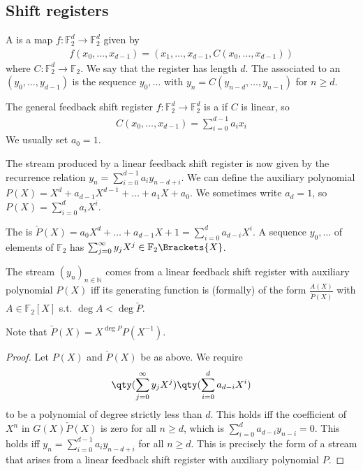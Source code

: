 \subsection{Shift registers}
\begin{definition}
    A  is a map $f \colon \mathbb F_2^d \to \mathbb F_2^d$ given by
    \begin{align*}
        f(x_0, \dots, x_{d-1}) = (x_1, \dots, x_{d-1}, C(x_0, \dots, x_{d-1}))
    \end{align*}
    where $C \colon \mathbb F_2^d \to \mathbb F_2$.
    We say that the register has length $d$.
    The  associated to an  $(y_0, \dots, y_{d-1})$ is the sequence $y_0, \dots$ with $y_n = C(y_{n-d}, \dots, y_{n-1})$ for $n \geq d$.
\end{definition}
\begin{definition}
    The general feedback shift register $f \colon \mathbb F_2^d \to \mathbb F_2^d$ is a  if $C$ is linear, so
    \begin{align*}
        C(x_0, \dots, x_{d-1}) = \sum_{i=0}^{d-1} a_i x_i
    \end{align*}
    We usually set $a_0 = 1$.
\end{definition}
The stream produced by a linear feedback shift register is now given by the recurrence relation $y_n = \sum_{i=0}^{d-1} a_i y_{n-d+i}$.
We can define the auxiliary polynomial $P(X) = X^d + a_{d-1} X^{d-1} + \dots + a_1 X + a_0$.
We sometimes write $a_d = 1$, so $P(X) = \sum_{i=0}^d a_i X^i$.
\begin{definition}
    The  is $\check{P}(X) = a_0 X^d + \dots + a_{d-1} X + 1 = \sum_{i=0}^d a_{d-i} X^i$.
    A sequence $y_0, \dots$ of elements of $\mathbb F_2$ has  $\sum_{j=0}^\infty y_j X^j \in \mathbb F_2\Brackets{X}$.
\end{definition}
\begin{theorem}
    The stream $(y_n)_{n \in \mathbb N}$ comes from a linear feedback shift register with auxiliary polynomial $P(X)$ iff its generating function is (formally) of the form $\frac{A(X)}{\check{P}(X)}$ with $A \in \mathbb F_2[X]$ s.t. $\deg A < \deg \check{P}$.
\end{theorem}
Note that $\check{P}(X) = X^{\deg P}P(X^{-1})$.
\begin{proof}
    Let $P(X)$ and $\check{P}(X)$ be as above.
    We require
    \begin{align*}
        \qty(\sum_{j=0}^\infty y_j X^j) \qty(\sum_{i=0}^d a_{d-i} X^i)
    \end{align*}
    to be a polynomial of degree strictly less than $d$.
    This holds iff the coefficient of $X^n$ in $G(X) \check{P}(X)$ is zero for all $n \geq d$, which is $\sum_{i=0}^d a_{d-i} y_{n-i} = 0$.
    This holds iff $y_n = \sum_{i=0}^{d-1} a_i y_{n-d + i}$ for all $n \geq d$.
    This is precisely the form of a stream that arises from a linear feedback shift register with auxiliary polynomial $P$.
\end{proof}
